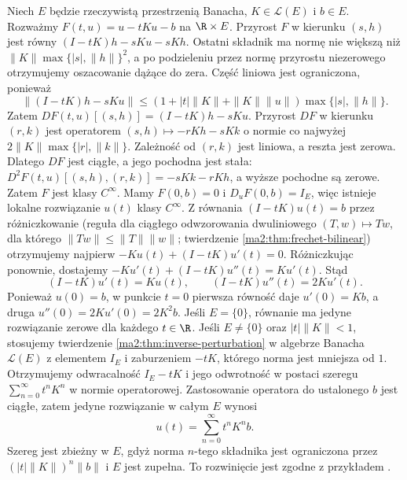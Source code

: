 \begin{przyklad}
\label{ma2:ex:implicit-operator}
Niech $E$ będzie rzeczywistą przestrzenią Banacha,
$K\in\mathcal L(E)$ i $b\in E$. Rozważmy
$F(t,u)=u-tKu-b$ na $\R\times E$.
Przyrost $F$ w kierunku $(s,h)$ jest równy
$(I-tK)h-sKu-sKh$. Ostatni składnik ma normę
nie większą niż $\|K\|\max\{|s|,\|h\|\}^2$,
a po podzieleniu przez normę przyrostu niezerowego
otrzymujemy oszacowanie dążące do zera.
Część liniowa jest ograniczona, ponieważ
\[
 \|(I-tK)h-sKu\|\le
 (1+|t|\|K\|+\|K\|\|u\|)\max\{|s|,\|h\|\}.
\]
Zatem $DF(t,u)[(s,h)]=(I-tK)h-sKu$.
Przyrost $DF$ w kierunku $(r,k)$ jest operatorem
$(s,h)\mapsto-rKh-sKk$ o normie co najwyżej
$2\|K\|\max\{|r|,\|k\|\}$. Zależność od $(r,k)$
jest liniowa, a reszta jest zerowa. Dlatego $DF$
jest ciągłe, a jego pochodna jest stała:
$D^2F(t,u)[(s,h),(r,k)]=-sKk-rKh$,
a wyższe pochodne są zerowe. Zatem $F$ jest klasy
$C^\infty$.
Mamy $F(0,b)=0$ i $D_uF(0,b)=I_E$, więc istnieje
lokalne rozwiązanie $u(t)$ klasy $C^\infty$.
Z równania $(I-tK)u(t)=b$ przez różniczkowanie
(reguła dla ciągłego odwzorowania dwuliniowego
$(T,w)\mapsto Tw$, dla którego $\|Tw\|\le\|T\|\|w\|$;
twierdzenie \ref{ma2:thm:frechet-bilinear})
otrzymujemy najpierw $-Ku(t)+(I-tK)u'(t)=0$.
Różniczkując ponownie, dostajemy
$-Ku'(t)+(I-tK)u''(t)=Ku'(t)$. Stąd
\[
 (I-tK)u'(t)=Ku(t),\qquad
 (I-tK)u''(t)=2Ku'(t).
\]
Ponieważ $u(0)=b$, w punkcie $t=0$ pierwsza
równość daje $u'(0)=Kb$, a druga
$u''(0)=2Ku'(0)=2K^2b$.
Jeśli $E=\{0\}$, równanie ma jedyne rozwiązanie
zerowe dla każdego $t\in\R$.
Jeśli $E\ne\{0\}$ oraz $|t|\|K\|<1$, stosujemy
twierdzenie \ref{ma2:thm:inverse-perturbation}
w algebrze Banacha $\mathcal L(E)$ z elementem $I_E$
i zaburzeniem $-tK$, którego norma jest mniejsza od $1$.
Otrzymujemy odwracalność $I_E-tK$ i jego odwrotność
w postaci szeregu $\sum_{n=0}^\infty t^nK^n$ w normie
operatorowej. Zastosowanie operatora do ustalonego $b$
jest ciągłe, zatem jedyne rozwiązanie w całym $E$ wynosi
\[
 u(t)=\sum_{n=0}^\infty t^n K^n b.
\]
Szereg jest zbieżny w $E$, gdyż norma $n$-tego
składnika jest ograniczona przez
$(|t|\|K\|)^n\|b\|$ i $E$ jest zupełna.
To rozwinięcie jest zgodne z przykładem
.
\end{przyklad}
